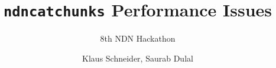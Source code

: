 \documentclass[12pt,nonotes]{beamer}
\author{\footnotesize Klaus Schneider, Saurab Dulal}
\title{\texttt{ndncatchunks} Performance Issues}
\subtitle{8th NDN Hackathon}
\begin{document}
\frame{\titlepage}

%

%	
\end{document}
